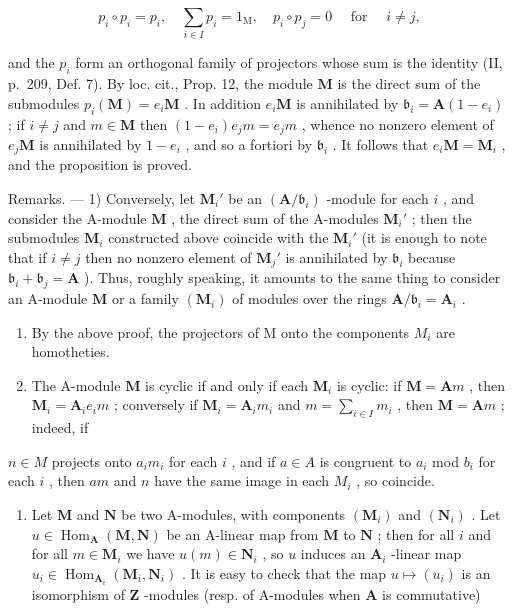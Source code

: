 \[
p _ {i} \circ p _ {i} = p _ {i}, \quad \sum_ {i \in I} p _ {i} = 1 _ {\mathrm{M}}, \quad p _ {i} \circ p _ {j} = 0 \quad \text { for } \quad i \neq j,
\]

and the \(p_i\) form an orthogonal family of projectors whose sum is the identity (II, p.~209, Def. 7). By loc. cit., Prop. 12, the module \(\mathbf{M}\) is the direct sum of the submodules \(p_i(\mathbf{M}) = e_i\mathbf{M}\) . In addition \(e_i\mathbf{M}\) is annihilated by \(\mathfrak{b}_i = \mathbf{A}(1 - e_i)\) ; if \(i \neq j\) and \(m \in \mathbf{M}\) then \((1 - e_i)e_jm = e_jm\) , whence no nonzero element of \(e_j\mathbf{M}\) is annihilated by \(1 - e_i\) , and so a fortiori by \(\mathfrak{b}_i\) . It follows that \(e_i\mathbf{M} = \mathbf{M}_i\) , and the proposition is proved.

Remarks. --- 1) Conversely, let \(\mathbf{M}_i'\) be an \((\mathbf{A} / \mathfrak{b}_i)\) -module for each \(i\) , and consider the A-module \(\mathbf{M}\) , the direct sum of the A-modules \(\mathbf{M}_i'\) ; then the submodules \(\mathbf{M}_i\) constructed above coincide with the \(\mathbf{M}_i'\) (it is enough to note that if \(i \neq j\) then no nonzero element of \(\mathbf{M}_j'\) is annihilated by \(\mathfrak{b}_i\) because \(\mathfrak{b}_i + \mathfrak{b}_j = \mathbf{A}\) ). Thus, roughly speaking, it amounts to the same thing to consider an A-module \(\mathbf{M}\) or a family \((\mathbf{M}_i)\) of modules over the rings \(\mathbf{A} / \mathfrak{b}_i = \mathbf{A}_i\) .

\begin{enumerate}
\def\labelenumi{\arabic{enumi})}
\setcounter{enumi}{1}
\item
  By the above proof, the projectors of M onto the components \(M_{i}\) are homotheties.
\item
  The A-module \(\mathbf{M}\) is cyclic if and only if each \(\mathbf{M}_i\) is cyclic: if \(\mathbf{M} = \mathbf{A}m\) , then \(\mathbf{M}_i = \mathbf{A}_i e_i m\) ; conversely if \(\mathbf{M}_i = \mathbf{A}_i m_i\) and \(m = \sum_{i \in I} m_i\) , then \(\mathbf{M} = \mathbf{A}m\) ; indeed, if
\end{enumerate}

\(n \in M\) projects onto \(a_i m_i\) for each \(i\) , and if \(a \in A\) is congruent to \(a_i\) mod \(b_i\) for each \(i\) , then \(am\) and \(n\) have the same image in each \(M_i\) , so coincide.

\begin{enumerate}
\def\labelenumi{\arabic{enumi})}
\setcounter{enumi}{3}
\tightlist
\item
  Let \(\mathbf{M}\) and \(\mathbf{N}\) be two A-modules, with components \((\mathbf{M}_i)\) and \((\mathbf{N}_i)\) . Let \(u \in \operatorname{Hom}_{\mathbf{A}}(\mathbf{M}, \mathbf{N})\) be an A-linear map from \(\mathbf{M}\) to \(\mathbf{N}\) ; then for all \(i\) and for all \(m \in \mathbf{M}_i\) we have \(u(m) \in \mathbf{N}_i\) , so \(u\) induces an \(\mathbf{A}_i\) -linear map \(u_i \in \operatorname{Hom}_{\mathbf{A}_i}(\mathbf{M}_i, \mathbf{N}_i)\) . It is easy to check that the map \(u \mapsto (u_i)\) is an isomorphism of \(\mathbf{Z}\) -modules (resp. of A-modules when \(\mathbf{A}\) is commutative)
\end{enumerate}

